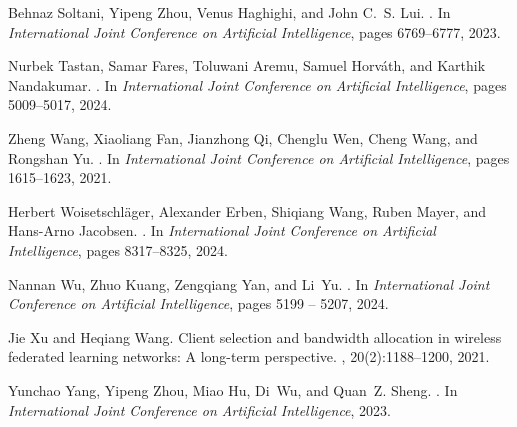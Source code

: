 \documentclass{article}
\begin{document}
\begin{thebibliography}{}
Behnaz Soltani, Yipeng Zhou, Venus Haghighi, and John C.~S. Lui.
.
\newblock In {\em { International Joint Conference on Artificial Intelligence}}, pages 6769--6777, 2023.

Nurbek Tastan, Samar Fares, Toluwani Aremu, Samuel Horváth, and Karthik Nandakumar.
.
\newblock In {\em {International Joint Conference on Artificial Intelligence}}, pages 5009--5017, 2024.

Zheng Wang, Xiaoliang Fan, Jianzhong Qi, Chenglu Wen, Cheng Wang, and Rongshan Yu.
.
\newblock In {\em {International Joint Conference on Artificial Intelligence}}, pages 1615--1623, 2021.

Herbert Woisetschläger, Alexander Erben, Shiqiang Wang, Ruben Mayer, and Hans-Arno Jacobsen.
.
\newblock In {\em {International Joint Conference on Artificial Intelligence}}, pages 8317--8325, 2024.

Nannan Wu, Zhuo Kuang, Zengqiang Yan, and Li~Yu.
.
\newblock In {\em International Joint Conference on Artificial Intelligence}, pages 5199 -- 5207, 2024.

Jie Xu and Heqiang Wang.
\newblock Client selection and bandwidth allocation in wireless federated learning networks: A long-term perspective.
, 20(2):1188--1200, 2021.

Yunchao Yang, Yipeng Zhou, Miao Hu, Di~Wu, and Quan~Z. Sheng.
.
\newblock In {\em {International Joint Conference on Artificial Intelligence}}, 2023.


\end{thebibliography}
\end{document}
